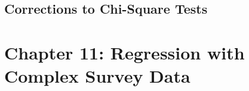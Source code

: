 \documentclass[article, 11pt, oneside]{memoir}
\begin{document}
\section{Corrections to Chi-Square Tests}




\chapter{Chapter 11: Regression with Complex Survey Data}
\end{document}
